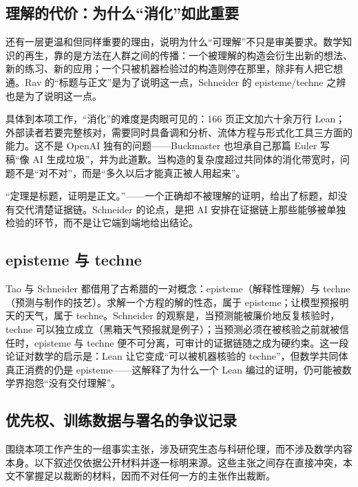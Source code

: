 \subsection{理解的代价：为什么“消化”如此重要}

还有一层更温和但同样重要的理由，说明为什么“可理解”不只是审美要求。数学知识的再生，靠的是方法在人群之间的传播：一个被理解的构造会衍生出新的想法、新的练习、新的应用；一个只被机器检验过的构造则停在那里，除非有人把它想通。Rav 的“标题与正文”是为了说明这一点，Schneider 的 episteme/techne 之辨也是为了说明这一点。

具体到本项工作，“消化”的难度是肉眼可见的：166 页正文加六十余万行 Lean；外部读者若要完整核对，需要同时具备调和分析、流体方程与形式化工具三方面的能力。这不是 OpenAI 独有的问题——Buckmaster 也坦承自己那篇 Euler 写稿“像 AI 生成垃圾”，并为此道歉。当构造的复杂度超过共同体的消化带宽时，问题不是“对不对”，而是“多久以后才能真正被人用起来”。

\begin{quotebox}
“定理是标题，证明是正文。”——一个正确却不被理解的证明，给出了标题，却没有交代清楚证据链。Schneider 的论点，是把 AI 安排在证据链上那些能够被单独检验的环节，而不是让它端到端地给出结论。
\end{quotebox}

\subsection{episteme 与 techne}

Tao 与 Schneider 都借用了古希腊的一对概念：episteme（解释性理解）与 techne（预测与制作的技艺）。求解一个方程的解的性态，属于 episteme；让模型预报明天的天气，属于 techne。Schneider 的观察是，当预测能被廉价地反复核验时，techne 可以独立成立（黑箱天气预报就是例子）；当预测必须在被核验之前就被信任时，episteme 与 techne 便不可分离，可审计的证据链随之成为硬约束。这一段论证对数学的启示是：Lean 让它变成“可以被机器核验的 techne”，但数学共同体真正消费的仍是 episteme——这解释了为什么一个 Lean 编过的证明，仍可能被数学界抱怨“没有交付理解”。

\subsection{优先权、训练数据与署名的争议记录}

围绕本项工作产生的一组事实主张，涉及研究生态与科研伦理，而不涉及数学内容本身。以下叙述仅依据公开材料并逐一标明来源。这些主张之间存在直接冲突，本文不掌握足以裁断的材料，因而不对任何一方的主张作出裁断。

